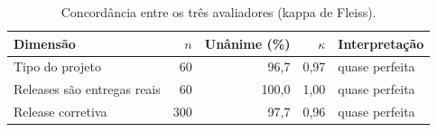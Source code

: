 \begin{table}[ht]
\centering
\caption{Concordância entre os três avaliadores (kappa de Fleiss).}
\label{tab:kappa}
\begin{tabular}{lrrrl}
\hline
Dimensão & $n$ & Unânime (\%) & $\kappa$ & Interpretação \\
\hline
Tipo do projeto & 60 & 96,7 & 0,97 & quase perfeita \\
Releases são entregas reais & 60 & 100,0 & 1,00 & quase perfeita \\
Release corretiva & 300 & 97,7 & 0,96 & quase perfeita \\
\hline
\end{tabular}
\end{table}

